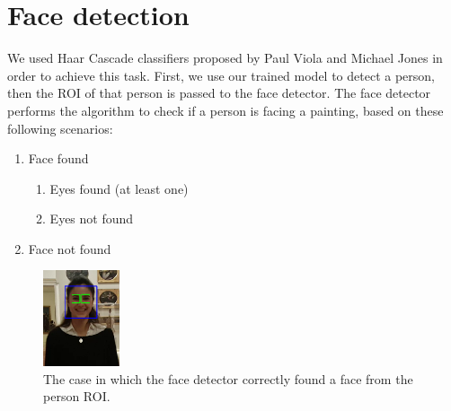 \section{Face detection}
We used Haar Cascade classifiers \cite{haar_cascade} proposed by Paul Viola and Michael Jones in order to achieve this task. First, we use our trained model to detect a person, then the ROI of that person is passed to the face detector. The face detector performs the algorithm to check if a person is facing a painting, based on these following scenarios:
\begin{enumerate}[label=\alph*)]
    \item Face found
    \begin{enumerate}[label=(\roman*)]
        \item \label{Eyes found} Eyes found (at least one)
        \item \label{Eyes not found} Eyes not found
    \end{enumerate}
    \item \label{Face not found} Face not found
\end{enumerate}

\begin{figure}[h!]
    \centering
    \includegraphics[width=0.2\textwidth]{pictures/face_detection/face_det2}
    \caption{The case in which the face detector correctly found a face from the person ROI.}
    \label{fig:Eyes}
\end{figure}


